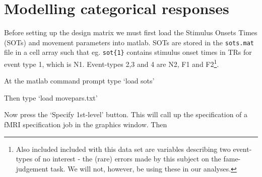 \section{Modelling categorical responses}

Before setting up the design matrix we must first load the Stimulus Onsets Times (SOTs) and movement parameters into matlab. SOTs are stored in the \verb!sots.mat! file in a cell array such that eg. \verb!sot{1}! contains stimulus onset times in TRs for event type 1, which is N1. Event-types 2,3 and 4 are N2, F1 and F2\footnote{Also included included with this data set are variables describing two event-types of no interest - the (rare) errors made by this subject on the fame-judgement task. We will not, however, be using these in our analyses.}.

\bi
\item{At the matlab command prompt type `load sots'}
\item{Then type `load movepars.txt'}
\ei

Now press the `Specify 1st-level' button. This will call up the specification of a fMRI specification job in the graphics window. Then

